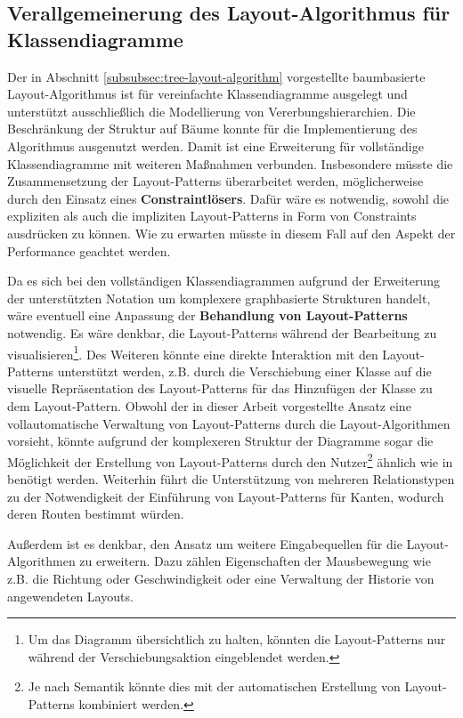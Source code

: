 \subsection{Verallgemeinerung des Layout-Algorithmus für Klassendiagramme}
\label{subsec:generalization-for-class-diagrams}

Der in Abschnitt \ref{subsubsec:tree-layout-algorithm} vorgestellte baumbasierte Layout-Algorithmus ist für vereinfachte Klassendiagramme ausgelegt und unterstützt ausschließlich die Modellierung von Vererbungshierarchien. Die Beschränkung der Struktur auf Bäume konnte für die Implementierung des Algorithmus ausgenutzt werden. Damit ist eine Erweiterung für vollständige Klassendiagramme mit weiteren Maßnahmen verbunden. Insbesondere müsste die Zusammensetzung der Layout-Patterns überarbeitet werden, möglicherweise durch den Einsatz eines \textbf{Constraintlösers}. Dafür wäre es notwendig, sowohl die expliziten als auch die impliziten Layout-Patterns in Form von Constraints ausdrücken zu können. Wie zu erwarten müsste in diesem Fall auf den Aspekt der Performance geachtet werden.

Da es sich bei den vollständigen Klassendiagrammen aufgrund der Erweiterung der unterstützten Notation um komplexere graphbasierte Strukturen handelt, wäre eventuell eine Anpassung der \textbf{Behandlung von Layout-Patterns} notwendig. Es wäre denkbar, die Layout-Patterns während der Bearbeitung zu visualisieren\footnote{Um das Diagramm übersichtlich zu halten, könnten die Layout-Patterns nur während der Verschiebungsaktion eingeblendet werden.}. Des Weiteren könnte eine direkte Interaktion mit den Layout-Patterns unterstützt werden, z.B. durch die Verschiebung einer Klasse auf die visuelle Repräsentation des Layout-Patterns für das Hinzufügen der Klasse zu dem Layout-Pattern. Obwohl der in dieser Arbeit vorgestellte Ansatz eine vollautomatische Verwaltung von Layout-Patterns durch die Layout-Algorithmen vorsieht, könnte aufgrund der komplexeren Struktur der Diagramme sogar die Möglichkeit der Erstellung von Layout-Patterns durch den Nutzer\footnote{Je nach Semantik könnte dies mit der automatischen Erstellung von Layout-Patterns kombiniert werden.} ähnlich wie in \cite{Maier12A-Pattern-based} benötigt werden. Weiterhin führt die Unterstützung von mehreren Relationstypen zu der Notwendigkeit der Einführung von Layout-Patterns für Kanten, wodurch deren Routen bestimmt würden.

Außerdem ist es denkbar, den Ansatz um weitere Eingabequellen für die Layout-Algorithmen zu erweitern. Dazu zählen Eigenschaften der Mausbewegung wie z.B. die Richtung oder Geschwindigkeit oder eine Verwaltung der Historie von angewendeten Layouts.
